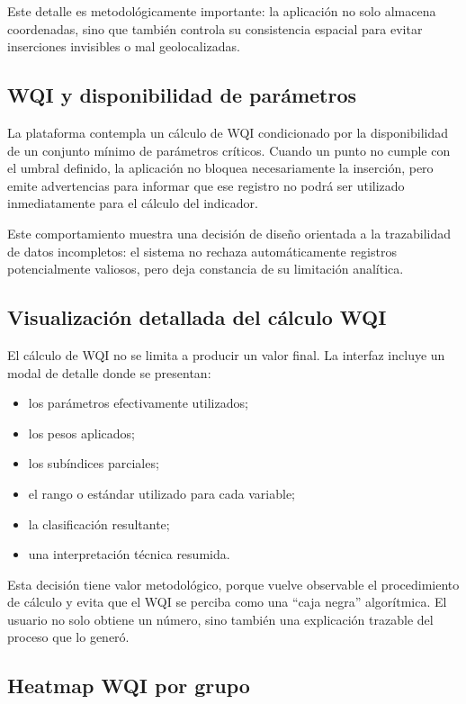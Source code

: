 \documentclass[12pt,a4paper]{report}
\begin{document}
Este detalle es metodol\'ogicamente importante: la aplicaci\'on no solo almacena coordenadas, sino que tambi\'en controla su consistencia espacial para evitar inserciones invisibles o mal geolocalizadas.

\subsection{WQI y disponibilidad de par\'ametros}

La plataforma contempla un c\'alculo de WQI condicionado por la disponibilidad de un conjunto m\'inimo de par\'ametros cr\'iticos. Cuando un punto no cumple con el umbral definido, la aplicaci\'on no bloquea necesariamente la inserci\'on, pero emite advertencias para informar que ese registro no podr\'a ser utilizado inmediatamente para el c\'alculo del indicador.

Este comportamiento muestra una decisi\'on de dise\~no orientada a la trazabilidad de datos incompletos: el sistema no rechaza autom\'aticamente registros potencialmente valiosos, pero deja constancia de su limitaci\'on anal\'itica.

\subsection{Visualizaci\'on detallada del c\'alculo WQI}

El c\'alculo de WQI no se limita a producir un valor final. La interfaz incluye un modal de detalle donde se presentan:

\begin{itemize}
    \item los par\'ametros efectivamente utilizados;
    \item los pesos aplicados;
    \item los sub\'indices parciales;
    \item el rango o est\'andar utilizado para cada variable;
    \item la clasificaci\'on resultante;
    \item una interpretaci\'on t\'ecnica resumida.
\end{itemize}

Esta decisi\'on tiene valor metodol\'ogico, porque vuelve observable el procedimiento de c\'alculo y evita que el WQI se perciba como una ``caja negra'' algor\'itmica. El usuario no solo obtiene un n\'umero, sino tambi\'en una explicaci\'on trazable del proceso que lo gener\'o.

\subsection{Heatmap WQI por grupo}
\end{document}
